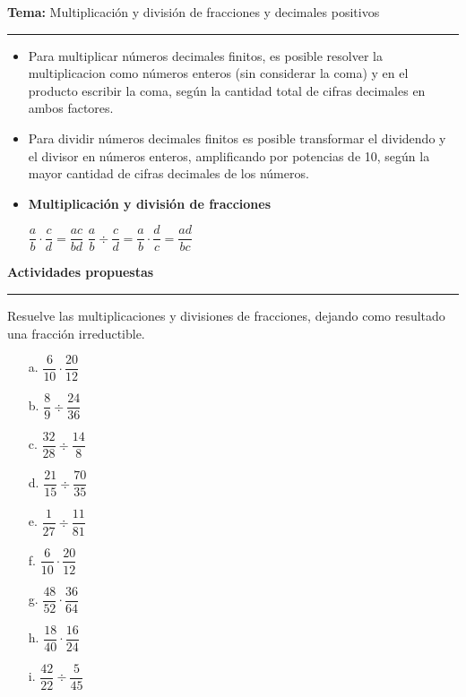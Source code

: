 \documentclass[spanish,letterpaper, 11pt, addpoints, answers]{exam}
\begin{document}
\begin{questions}
\newpage
  \vspace{0.1in}
  \parbox{6in}{
  \textbf{Tema:} Multiplicación y división de fracciones y decimales positivos}
  \vspace{0.15in}
  \hrule 
  
  \begin{itemize}
    \item Para multiplicar números decimales finitos, es posible resolver la multiplicacion como números enteros (sin considerar la coma) y en el producto escribir la coma, según la cantidad total de cifras decimales en ambos factores.
  
    \item Para dividir números decimales finitos es posible transformar el dividendo y el divisor en números enteros, amplificando por potencias de 10, según la mayor cantidad de cifras decimales de los números.

    \item \textbf{Multiplicación y división de fracciones}
\begin{center}
$\dfrac{a}{b}\cdot\dfrac{c}{d}=\dfrac{ac}{bd}$ \hspace{2cm} $\dfrac{a}{b}\div\dfrac{c}{d}=\dfrac{a}{b}\cdot\dfrac{d}{c}=\dfrac{ad}{bc}$

\end{center}

    
  \end{itemize}
  
  \parbox{6in}{
  \textbf{Actividades propuestas}}
  \vspace{0.15in}
  \hrule 

  \question Resuelve las multiplicaciones y divisiones de fracciones, dejando como resultado una fracción irreductible.

  \begin{multicols}{3}
    
 
  \begin{itemize}
    \item[a.] $\dfrac{6}{10}\cdot\dfrac{20}{12}$
    \item[b.] $\dfrac{8}{9}\div\dfrac{24}{36}$
    \item[c.] $\dfrac{32}{28}\div\dfrac{14}{8}$
    \item[d.] $\dfrac{21}{15}\div\dfrac{70}{35}$
    \item[e.] $\dfrac{1}{27}\div\dfrac{11}{81}$
    \item[f.] $\dfrac{6}{10}\cdot\dfrac{20}{12}$
    \item[g.] $\dfrac{48}{52}\cdot\dfrac{36}{64}$
    \item[h.] $\dfrac{18}{40}\cdot\dfrac{16}{24}$
    \item[i.] $\dfrac{42}{22}\div\dfrac{5}{45}$  
  \end{itemize}
 \end{multicols}



\end{questions}
\end{document}
